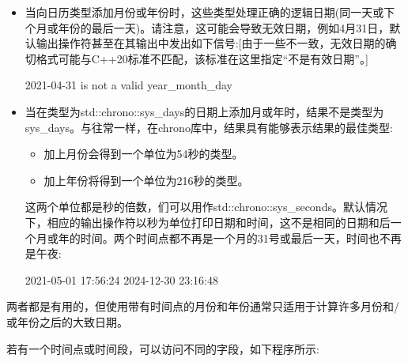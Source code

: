 \begin{itemize}
\item 
当向日历类型添加月份或年份时，这些类型处理正确的逻辑日期(同一天或下个月或年份的最后一天)。请注意，这可能会导致无效日期，例如4月31日，默认输出操作符甚至在其输出中发出如下信号:[由于一些不一致，无效日期的确切格式可能与C++20标准不匹配，该标准在这里指定“不是有效日期”。]

\begin{shell}
2021-04-31 is not a valid year_month_day
\end{shell}

\item
当在类型为std::chrono::sys\_days的日期上添加月或年时，结果不是类型为sys\_days。与往常一样，在chrono库中，结果具有能够表示结果的最佳类型:

\begin{itemize}
\item 
加上月份会得到一个单位为54秒的类型。

\item 
加上年份将得到一个单位为216秒的类型。
\end{itemize}

这两个单位都是秒的倍数，们可以用作std::chrono::sys\_seconds。默认情况下，相应的输出操作符以秒为单位打印日期和时间，这不是相同的日期和后一个月或年的时间。两个时间点都不再是一个月的31号或最后一天，时间也不再是午夜:

\begin{shell}
2021-05-01 17:56:24
2024-12-30 23:16:48
\end{shell}

\end{itemize}

两者都是有用的，但使用带有时间点的月份和年份通常只适用于计算许多月份和/或年份之后的大致日期。


若有一个时间点或时间段，可以访问不同的字段，如下程序所示:


